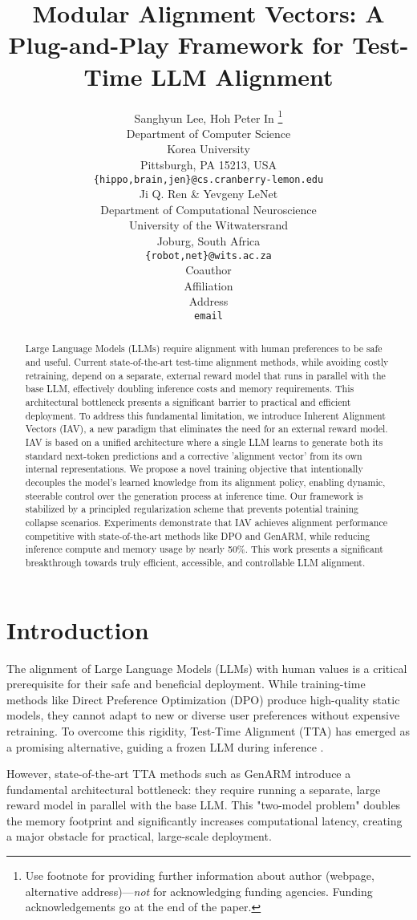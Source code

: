 \documentclass{article} %
\title{Modular Alignment Vectors: A Plug-and-Play Framework for Test-Time LLM Alignment}
\author{Sanghyun Lee, Hoh Peter In \thanks{ Use footnote for providing further information
about author (webpage, alternative address)---\emph{not} for acknowledging
funding agencies.  Funding acknowledgements go at the end of the paper.} \\
Department of Computer Science\\
Korea University\\
Pittsburgh, PA 15213, USA \\
\texttt{\{hippo,brain,jen\}@cs.cranberry-lemon.edu} \\
\And
Ji Q. Ren \& Yevgeny LeNet \\
Department of Computational Neuroscience \\
University of the Witwatersrand \\
Joburg, South Africa \\
\texttt{\{robot,net\}@wits.ac.za} \\
\AND
Coauthor \\
Affiliation \\
Address \\
\texttt{email}
}
\begin{document}
\maketitle

\begin{abstract}
Large Language Models (LLMs) require alignment with human preferences to be safe and useful. Current state-of-the-art test-time alignment methods, while avoiding costly retraining, depend on a separate, external reward model that runs in parallel with the base LLM, effectively doubling inference costs and memory requirements. This architectural bottleneck presents a significant barrier to practical and efficient deployment. To address this fundamental limitation, we introduce Inherent Alignment Vectors (IAV), a new paradigm that eliminates the need for an external reward model. IAV is based on a unified architecture where a single LLM learns to generate both its standard next-token predictions and a corrective 'alignment vector' from its own internal representations. We propose a novel training objective that intentionally decouples the model's learned knowledge from its alignment policy, enabling dynamic, steerable control over the generation process at inference time. Our framework is stabilized by a principled regularization scheme that prevents potential training collapse scenarios. Experiments demonstrate that IAV achieves alignment performance competitive with state-of-the-art methods like DPO and GenARM, while reducing inference compute and memory usage by nearly 50\%. This work presents a significant breakthrough towards truly efficient, accessible, and controllable LLM alignment.
\end{abstract}
\section{Introduction}

The alignment of Large Language Models (LLMs) with human values is a critical prerequisite for their safe and beneficial deployment. While training-time methods like Direct Preference Optimization (DPO) \citep{rafailov2023direct} produce high-quality static models, they cannot adapt to new or diverse user preferences without expensive retraining. To overcome this rigidity, Test-Time Alignment (TTA) has emerged as a promising alternative, guiding a frozen LLM during inference \citep{khanov2024args, xu2024genarm}.

However, state-of-the-art TTA methods such as GenARM \citep{xu2024genarm} introduce a fundamental architectural bottleneck: they require running a separate, large reward model in parallel with the base LLM. This "two-model problem" doubles the memory footprint and significantly increases computational latency, creating a major obstacle for practical, large-scale deployment.
\end{document}
